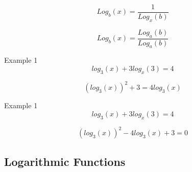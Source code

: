 \documentclass[]{report}
\begin{document}
\[ Log_b(x) = \frac{1}{Log_x(b)}  \]

\[ Log_b(x) = \frac{Log_a(b)}{Log_a(b)}  \]


Example 1
\[ log_3(x) + 3 log_x(3) = 4  \]

\[ \left(log_3(x)\right)^2 + 3  = 4 log_3(x)  \]

Example 1
\[ log_3(x) + 3 log_x(3) = 4  \]

\[ \left(log_3(x)\right)^2 - 4 log_3(x) + 3  = 0  \]
\subsection{Logarithmic Functions}
\end{document}

